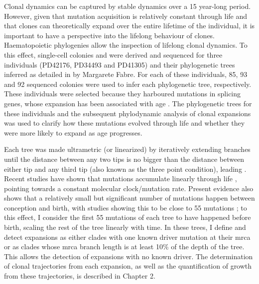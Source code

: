Clonal dynamics can be captured by stable dynamics over a 15 year-long period.  However, given that mutation acquisition is relatively constant through life \cite{Abascal_2021_gjvqfm} and that clones can theoretically expand over the entire lifetime of the individual, it is important to have a perspective into the lifelong behaviour of clones. Haematopoietic phylogenies allow the inspection of lifelong clonal dynamics. To this effect, single-cell colonies and were derived and sequenced for three individuals (PD42176, PD34493 and PD41305) and their phylogenetic trees inferred as detailed in \cite{Fabre2021-uw} by Margarete Fabre. For each of these individuals, 85, 93 and 92 sequenced colonies were used to infer each phylogenetic tree, respectively. These individuals were selected because they harboured mutations in splicing genes, whose expansion has been associated with age \cite{McKerrell2015-rl}. The phylogenetic trees for these individuals and the subsequent phylodynamic analysis of clonal expansions was used to clarify how these mutations evolved through life and whether they were more likely to expand as age progresses.

Each tree was made ultrametric (or linearized) by iteratively extending branches until the distance between any two tips is no bigger than the distance between either tip and any third tip (also known as the three point condition), leading . Recent studies have shown that mutations accumulate linearly through life \cite{Abascal_2021_gjvqfm,Mitchell2021-zl}, pointing towards a constant molecular clock/mutation rate. Present evidence also shows that a relatively small but significant number of mutations happen between conception and birth, with studies showing this to be close to 55 mutations \cite{SpencerChapman_2021_gjz4x4,Mitchell2021-zl}; to this effect, I consider the first 55 mutations of each tree to have happened before birth, scaling the rest of the tree linearly with time. In these trees, I define and detect expansions as either clades with one known driver mutation at their \ac{mrca} or as clades whose \ac{mrca} branch length is at least 10\% of the depth of the tree. This allows the detection of expansions with no known driver. The determination of clonal trajectories from each expansion, as well as the quantification of growth from these trajectories, is described in Chapter 2.

